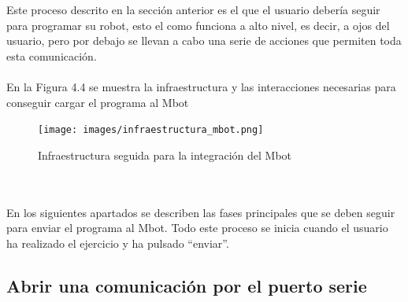 \documentclass{report}
\begin{document}
Este proceso descrito en la sección anterior es el que el usuario debería seguir para programar su robot, esto el como funciona a alto nivel, es decir, a ojos del usuario, pero por debajo se llevan a cabo una serie de acciones que permiten toda esta comunicación.
\\
\\
En la Figura 4.4 se muestra la infraestructura y las interacciones necesarias para conseguir cargar el programa al Mbot
\\
\begin{figure}[h!]
  \centering
    \texttt{[image: images/infraestructura\_mbot.png]}
  \caption{Infraestructura seguida para la integración del Mbot}
  \label{Infraestructura seguida para la integración del Mbot}
\end{figure}
\\
\\
En los siguientes apartados se describen las fases principales que se deben seguir para enviar el programa al Mbot. Todo este proceso se inicia cuando el usuario ha realizado el ejercicio y ha pulsado “enviar”.

\subsection{Abrir una comunicación por el puerto serie}
\end{document}

